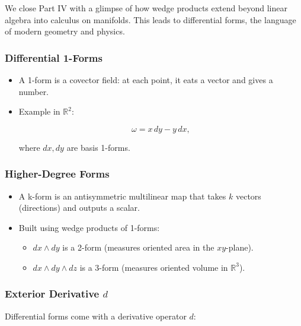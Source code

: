 \documentclass[
  letterpaper,
  DIV=11,
  numbers=noendperiod]{scrreprt}
\providecommand{\tightlist}{%
  \setlength{\itemsep}{0pt}\setlength{\parskip}{0pt}}
\begin{document}
We close Part IV with a glimpse of how wedge products extend beyond
linear algebra into calculus on manifolds. This leads to differential
forms, the language of modern geometry and physics.

\subsubsection{Differential 1-Forms}\label{differential-1-forms}

\begin{itemize}
\item
  A 1-form is a covector field: at each point, it eats a vector and
  gives a number.
\item
  Example in \(\mathbb{R}^2\):

  \[
  \omega = x \, dy - y \, dx,
  \]

  where \(dx, dy\) are basis 1-forms.
\end{itemize}

\subsubsection{Higher-Degree Forms}\label{higher-degree-forms}

\begin{itemize}
\item
  A k-form is an antisymmetric multilinear map that takes \(k\) vectors
  (directions) and outputs a scalar.
\item
  Built using wedge products of 1-forms:

  \begin{itemize}
  \tightlist
  \item
    \(dx \wedge dy\) is a 2-form (measures oriented area in the
    \(xy\)-plane).
  \item
    \(dx \wedge dy \wedge dz\) is a 3-form (measures oriented volume in
    \(\mathbb{R}^3\)).
  \end{itemize}
\end{itemize}

\subsubsection{\texorpdfstring{Exterior Derivative
\(d\)}{Exterior Derivative d}}\label{exterior-derivative-d}

Differential forms come with a derivative operator \(d\):
\end{document}
